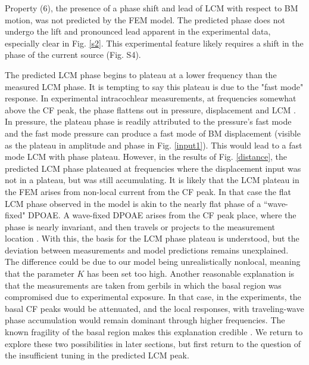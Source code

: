 \documentclass{biophys-new}
\begin{document}
\par{Property (6), the presence of a phase shift and lead of LCM with respect to BM motion, was not predicted by the FEM model.  The predicted phase does not undergo the lift and pronounced lead apparent in the experimental data, especially clear in Fig. \ref{s2}.  This experimental feature likely requires a shift in the phase of the current source (Fig. S4).}  
\par{The predicted LCM phase begins to plateau at a lower frequency than the measured LCM phase. It is tempting to say this plateau is due to the "fast mode" response. In experimental intracochlear measurements, at frequencies somewhat above the CF peak, the phase flattens out in pressure, displacement and LCM \cite{olson2013}.  In pressure, the plateau phase is readily attributed to the pressure's fast mode \cite{peterson1950} and the fast mode pressure can produce a fast mode of BM displacement (visible as the plateau in amplitude and phase in Fig. \ref{input1}). This would lead to a fast mode LCM with phase plateau.  However, in the results of Fig. \ref{distance}, the predicted LCM phase plateaued at frequencies where the displacement input was not in a plateau, but was still accumulating. It is likely that the LCM plateau in the FEM arises from non-local current from the CF peak.  In that case the flat LCM  phase observed in the model is akin to the nearly flat phase of a ``wave-fixed" DPOAE.  A wave-fixed DPOAE arises from the CF peak place, where the phase is nearly invariant, and then travels or projects to the measurement location \cite{shera1999}.  With this, the basis for the LCM phase plateau is understood, but the deviation between measurements and model predictions remains unexplained.  The difference could be due to our model being unrealistically nonlocal, meaning that the parameter $K$ has been set too high. Another reasonable explanation is that the measurements are taken from gerbils in which the basal region was compromised due to experimental exposure.  In that case, in the experiments, the basal CF peaks would be attenuated, and the local responses, with traveling-wave phase accumulation would remain dominant through higher frequencies. The known fragility of the basal region makes this explanation credible \cite{overstreet}.  We return to explore these two possibilities in later sections, but first return to the question of the insufficient tuning in the predicted LCM peak.}
\end{document}
